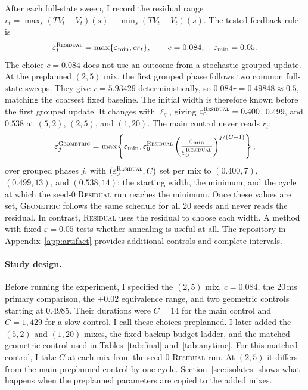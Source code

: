 \documentclass{article}
\newcommand{\R}{\textsc{Residual}}
\newcommand{\G}{\textsc{Geometric}}
\begin{document}
After each full-state sweep, I record the residual range
$r_t=\max_s(TV_t-V_t)(s)-
\min_s(TV_t-V_t)(s)$.  The tested feedback rule is
\begin{equation}
 \varepsilon_t^{\R}=\max\{\varepsilon_{\min},c r_t\},
 \qquad c=0.084,\quad \varepsilon_{\min}=0.05.
 \label{eq:residual}
\end{equation}
The choice $c=0.084$ does not use an outcome from a stochastic grouped update.
At the preplanned $(2,5)$ mix, the first grouped phase follows two common
full-state sweeps.  They give $r=5.93429$ deterministically, so
$0.084r=0.49848\approx0.5$, matching the coarsest fixed baseline.  The initial
width is therefore known before the first grouped update.  It changes with
$\ell_g$, giving
$\varepsilon^{\R}_0=0.400$, $0.499$, and $0.538$ at $(5,2)$, $(2,5)$, and
$(1,20)$.  The main control never reads $r_t$:
\begin{equation}
 \varepsilon_j^{\G}=\max\!\left\{\varepsilon_{\min},
 \varepsilon^{\R}_0\left(\frac{\varepsilon_{\min}}{\varepsilon^{\R}_0}
 \right)^{j/(C-1)}\right\},
 \label{eq:geometric}
\end{equation}
over grouped phases $j$, with $(\varepsilon^{\R}_0,C)$ set per mix to
$(0.400,7)$, $(0.499,13)$, and $(0.538,14)$: the starting width, the minimum, and
the cycle at which the seed-0 \R{} run reaches the minimum.  Once these values
are set, \G{} follows the same schedule for all 20 seeds and never reads the
residual.  In contrast, \R{} uses the residual to choose each width.  A method
with fixed $\varepsilon=0.05$ tests whether annealing is useful at all.  The
repository in Appendix~\ref{app:artifact} provides additional controls and
complete intervals.

\paragraph{Study design.}
Before running the experiment, I specified the $(2,5)$ mix, $c=0.084$, the
20\,ms primary comparison, the $\pm0.02$ equivalence range, and two geometric
controls starting at $0.4985$.  Their durations were $C=14$ for the main
control and $C=1{,}429$ for a slow control.  I call these choices preplanned.  I
later added the $(5,2)$ and $(1,20)$ mixes, the fixed-backup budget ladder, and
the matched geometric control used in Tables~\ref{tab:final}
and~\ref{tab:anytime}.  For this matched control, I take $C$ at each mix from
the seed-0 \R{} run.  At $(2,5)$ it differs from the main preplanned control by
one cycle.  Section~\ref{sec:isolates} shows what happens when the preplanned
parameters are copied to the added mixes.
\end{document}
